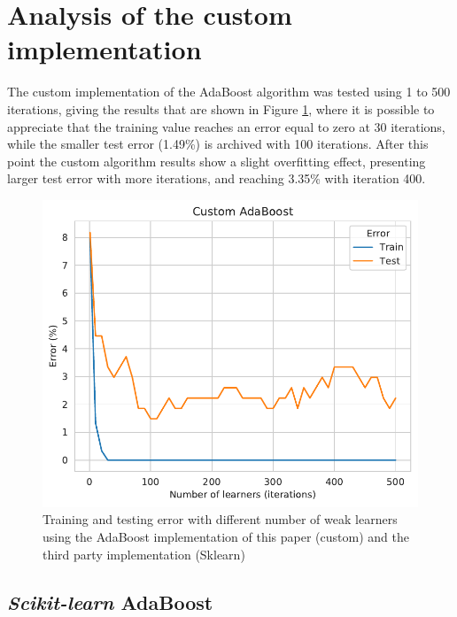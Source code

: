 \documentclass[11pt,twocolumn,letterpaper]{article}
\begin{document}
\section{Analysis of the custom implementation}

The custom implementation of the AdaBoost algorithm was tested using 1 to 500 iterations, giving the results that are shown in Figure \ref{fig:nlearners_adaboost_custom}, where it is possible to appreciate that the training value reaches an error equal to zero at 30 iterations, while the smaller test error (1.49\%) is archived with 100 iterations. After this point the custom algorithm results show a slight overfitting effect, presenting larger test error with more iterations, and reaching 3.35\% with iteration 400.

\begin{figure}[h]
	\begin{center}
		\includegraphics[width=1.0\linewidth]{nlearners_adaboost_custom.pdf}
		\caption{Training and testing error with different number of weak learners using the AdaBoost implementation of this paper (custom) and the third party implementation (Sklearn)}
		\label{fig:nlearners_adaboost_custom}
	\end{center}
\end{figure}

\subsection{\textit{Scikit-learn} AdaBoost}
\end{document}
